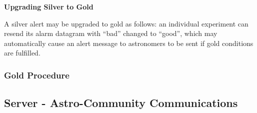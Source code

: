 \documentclass{article}
\begin{document}
\textbf{Upgrading Silver to Gold}

A silver alert may be upgraded to gold as follows:  an
individual experiment can resend its alarm datagram with ``bad''
changed to ``good'', which may automatically cause an alert message to
astronomers to be sent if gold conditions are fulfilled.  


\subsubsection{Gold Procedure}



\subsection{Server - Astro-Community Communications}
\end{document}
